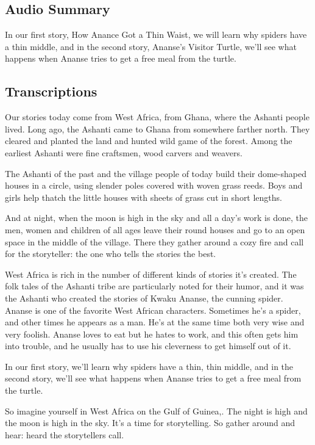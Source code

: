 \subsection{Audio Summary}

In our first story, How Anance Got a Thin Waist, we will learn why spiders have a thin middle, and in the second story, Ananse's Visitor Turtle, we'll see what happens when Ananse tries to get a free meal from the turtle.

\subsection{Transcriptions}

Our stories today come from West Africa, from Ghana, where the Ashanti people lived. Long ago, the Ashanti came to Ghana from somewhere farther north. They cleared and planted the land and hunted wild game of the forest. Among the earliest Ashanti were fine craftsmen, wood carvers and weavers.

The Ashanti of the past and the village people of today build their dome-shaped houses in a circle, using slender poles covered with woven grass reeds. Boys and girls help thatch the little houses with sheets of grass cut in short lengths.

And at night, when the moon is high in the sky and all a day's work is done, the men, women and children of all ages leave their round houses and go to an open space in the middle of the village. There they gather around a cozy fire and call for the storyteller: the one who tells the stories the best.

West Africa is rich in the number of different kinds of stories it's created. The folk tales of the Ashanti tribe are particularly noted for their humor, and it was the Ashanti who created the stories of Kwaku Ananse, the cunning spider. Ananse is one of the favorite West African characters. Sometimes he's a spider, and other times he appears as a man. He's at the same time both very wise and very foolish. Ananse loves to eat but he hates to work, and this often gets him into trouble, and he usually has to use his cleverness to get himself out of it.

In our first story, we'll learn why spiders have a thin, thin middle, and in the second story, we'll see what happens when Ananse tries to get a free meal from the turtle.

So imagine yourself in West Africa on the Gulf of Guinea,. The night is high and the moon is high in the sky. It's a time for storytelling. So gather around and hear: heard the storytellers call.

